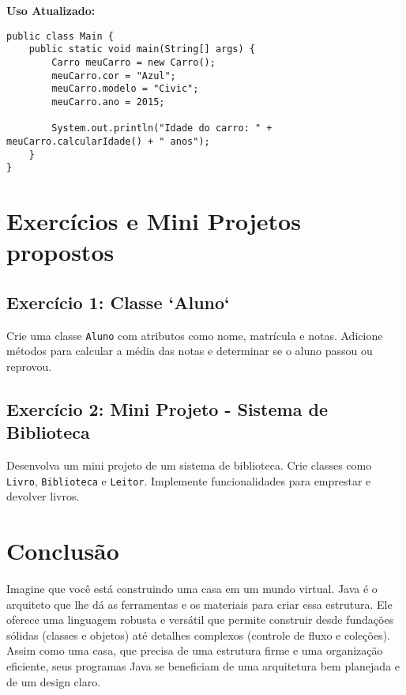 \documentclass[a4paper,12pt]{book}
\begin{document}
\textbf{Uso Atualizado:}

\begin{verbatim}
public class Main {
    public static void main(String[] args) {
        Carro meuCarro = new Carro();
        meuCarro.cor = "Azul";
        meuCarro.modelo = "Civic";
        meuCarro.ano = 2015;

        System.out.println("Idade do carro: " + meuCarro.calcularIdade() + " anos");
    }
}
\end{verbatim}

\section{Exercícios e Mini Projetos propostos}

\subsection{Exercício 1: Classe `Aluno`}

Crie uma classe \texttt{Aluno} com atributos como nome, matrícula e notas. Adicione métodos para calcular a média das notas e determinar se o aluno passou ou reprovou.

\subsection{Exercício 2: Mini Projeto - Sistema de Biblioteca}

Desenvolva um mini projeto de um sistema de biblioteca. Crie classes como \texttt{Livro}, \texttt{Biblioteca} e \texttt{Leitor}. Implemente funcionalidades para emprestar e devolver livros.

\section{Conclusão}

Imagine que você está construindo uma casa em um mundo virtual. Java é o arquiteto que lhe dá as ferramentas e os materiais para criar essa estrutura. Ele oferece uma linguagem robusta e versátil que permite construir desde fundações sólidas (classes e objetos) até detalhes complexos (controle de fluxo e coleções). Assim como uma casa, que precisa de uma estrutura firme e uma organização eficiente, seus programas Java se beneficiam de uma arquitetura bem planejada e de um design claro.
\end{document}
